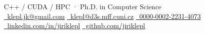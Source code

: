 \begin{minipage}[t]{\linewidth}
  {\Huge\bfseries \ThesisAuthor{}}\par
  \vspace{0.25em}
  C++ / CUDA / HPC · Ph.D. in Computer Science\\
  \small
  \ifdefined \industry
    \href{mailto:klepl.jk@gmail.com}{\ klepl.jk@gmail.com}
    \quad
  \else
    \href{mailto:klepl@d3s.mff.cuni.cz}{\ klepl@d3s.mff.cuni.cz}
    \quad
    \href{https://orcid.org/0000-0002-2231-4073}{\ 0000-0002-2231-4073}
    \quad
  \fi
  \href{https://www.linkedin.com/in/jiriklepl}{\ linkedin.com/in/jiriklepl}
  \quad
  \href{https://github.com/jiriklepl}{\ github.com/jiriklepl}
\end{minipage}
